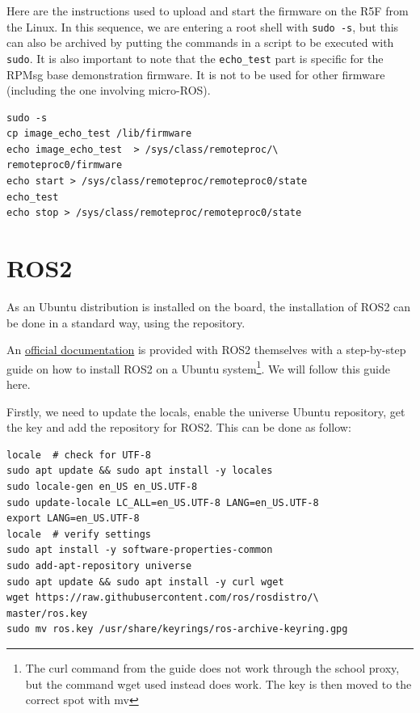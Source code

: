 \documentclass[10pt]{article}
\begin{document}
Here are the instructions used to upload and start the firmware
on the R5F from the Linux.
In this sequence, we are entering a root shell with \verb|sudo -s|, but this can
also be archived by putting the commands in a script to be executed with \verb|sudo|.
It is also important to note that the \verb|echo_test| part is specific for the RPMsg base
demonstration firmware. It is not to be used for other firmware (including the one involving micro-ROS).
\begin{tcolorbox}
\begin{verbatim}
sudo -s
cp image_echo_test /lib/firmware
echo image_echo_test  > /sys/class/remoteproc/\
remoteproc0/firmware
echo start > /sys/class/remoteproc/remoteproc0/state
echo_test
echo stop > /sys/class/remoteproc/remoteproc0/state
\end{verbatim}
\end{tcolorbox}

\pagebreak
\section{ROS2}
\label{sec:ros2}
As an Ubuntu distribution is installed on the board, the installation of ROS2 can be done
in a standard way, using the repository.

An \href{https://docs.ros.org/en/humble/Installation/Ubuntu-Install-Debians.html}{official documentation}
is provided with ROS2 themselves with a step-by-step guide on how to install
ROS2 on a Ubuntu system\footnote{The curl command from the guide does not work through the school proxy,
  but the command wget used instead does work. The key is then moved to the correct spot with mv}.
We will follow this guide here.

Firstly, we need to update the locals, enable the universe Ubuntu repository, get the key and add the repository for ROS2. This can be done as follow:

\begin{tcolorbox}
\begin{verbatim}
locale  # check for UTF-8
sudo apt update && sudo apt install -y locales
sudo locale-gen en_US en_US.UTF-8
sudo update-locale LC_ALL=en_US.UTF-8 LANG=en_US.UTF-8
export LANG=en_US.UTF-8
locale  # verify settings
sudo apt install -y software-properties-common
sudo add-apt-repository universe
sudo apt update && sudo apt install -y curl wget
wget https://raw.githubusercontent.com/ros/rosdistro/\
master/ros.key
sudo mv ros.key /usr/share/keyrings/ros-archive-keyring.gpg
\end{verbatim}
\end{tcolorbox}
\end{document}
